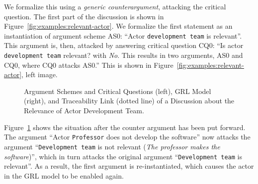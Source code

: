 We formalize this using a \emph{generic counterargument}, attacking the critical question. The first part of the discussion is shown in Figure~\ref{fig:examples:relevant-actor}. We formalize the first statement as an instantiation of argument scheme AS0: ``Actor \texttt{development team} is relevant''. This argument is, then, attacked by answering critical question CQ0: ``Is actor \texttt{development team} relevant? with \emph{No}. This results in two arguments, AS0 and CQ0, where CQ0 attacks AS0.'' This is shown in Figure~\ref{fig:examples:relevant-actor}, left image.

\begin{figure}[ht!]
\centering
\caption{Argument Schemes and Critical Questions (left), GRL Model (right), and Traceability Link (dotted line) of a Discussion about the Relevance of Actor Development Team.}
\label{fig:examples:relevant-actor2}
\end{figure}

Figure~\ref{fig:examples:relevant-actor2} shows the situation after the counter argument has been put forward. The argument ``Actor \texttt{Professor} does not develop the software'' now attacks the argument ``\texttt{Development team} is not relevant (\emph{The professor makes the software})'', which in turn attacks the original argument ``\texttt{Development team} is relevant''. As a result, the first argument is re-instantiated, which causes the actor in the GRL model to be enabled again.

